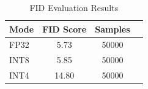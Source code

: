 \begin{table}
\begin{tabular}{lccc}
    \toprule \textbf{Mode} & \textbf{FID Score} & \textbf{Samples} \\
    \midrule FP32          & 5.73               & 50000            \\
    INT8                   & 5.85               & 50000            \\
    INT4                   & 14.80              & 50000            \\
    \bottomrule
\end{tabular}
\caption{FID Evaluation Results}
\label{tab:fid_eval}
\end{table}